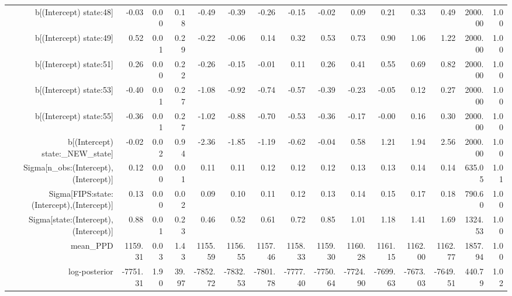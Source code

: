 \begin{table}[ht]
\begin{tabular}{rrrrrrrrrrrrrrr}
  b[(Intercept) state:48] & -0.03 & 0.00 & 0.18 & -0.49 & -0.39 & -0.26 & -0.15 & -0.02 & 0.09 & 0.21 & 0.33 & 0.49 & 2000.00 & 1.00 \\ 
  b[(Intercept) state:49] & 0.52 & 0.01 & 0.29 & -0.22 & -0.06 & 0.14 & 0.32 & 0.53 & 0.73 & 0.90 & 1.06 & 1.22 & 2000.00 & 1.00 \\ 
  b[(Intercept) state:51] & 0.26 & 0.00 & 0.22 & -0.26 & -0.15 & -0.01 & 0.11 & 0.26 & 0.41 & 0.55 & 0.69 & 0.82 & 2000.00 & 1.00 \\ 
  b[(Intercept) state:53] & -0.40 & 0.01 & 0.27 & -1.08 & -0.92 & -0.74 & -0.57 & -0.39 & -0.23 & -0.05 & 0.12 & 0.27 & 2000.00 & 1.00 \\ 
  b[(Intercept) state:55] & -0.36 & 0.01 & 0.27 & -1.02 & -0.88 & -0.70 & -0.53 & -0.36 & -0.17 & -0.00 & 0.16 & 0.30 & 2000.00 & 1.00 \\ 
  b[(Intercept) state:\_NEW\_state] & -0.02 & 0.02 & 0.94 & -2.36 & -1.85 & -1.19 & -0.62 & -0.04 & 0.58 & 1.21 & 1.94 & 2.56 & 2000.00 & 1.00 \\ 
  Sigma[n\_obs:(Intercept),(Intercept)] & 0.12 & 0.00 & 0.01 & 0.11 & 0.11 & 0.12 & 0.12 & 0.12 & 0.13 & 0.13 & 0.14 & 0.14 & 635.05 & 1.01 \\ 
  Sigma[FIPS:state:(Intercept),(Intercept)] & 0.13 & 0.00 & 0.02 & 0.09 & 0.10 & 0.11 & 0.12 & 0.13 & 0.14 & 0.15 & 0.17 & 0.18 & 790.60 & 1.00 \\ 
  Sigma[state:(Intercept),(Intercept)] & 0.88 & 0.01 & 0.23 & 0.46 & 0.52 & 0.61 & 0.72 & 0.85 & 1.01 & 1.18 & 1.41 & 1.69 & 1324.53 & 1.00 \\ 
  mean\_PPD & 1159.31 & 0.03 & 1.43 & 1155.59 & 1156.55 & 1157.46 & 1158.33 & 1159.30 & 1160.28 & 1161.15 & 1162.00 & 1162.77 & 1857.94 & 1.00 \\ 
  log-posterior & -7751.31 & 1.90 & 39.97 & -7852.72 & -7832.53 & -7801.78 & -7777.40 & -7750.64 & -7724.90 & -7699.63 & -7673.03 & -7649.51 & 440.79 & 1.02 \\ 
   \hline
\end{tabular}
\end{table}
